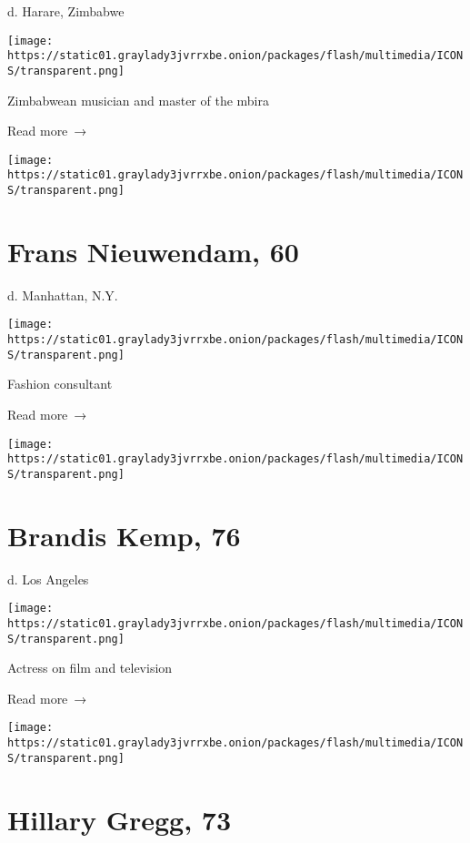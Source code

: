 d. Harare, Zimbabwe

\texttt{[image: https://static01.graylady3jvrrxbe.onion/packages/flash/multimedia/ICONS/transparent.png]}

Zimbabwean musician and master of the mbira

 Read more~→

\href{https://www.nytimes3xbfgragh.onion/2020/07/18/obituaries/frans-nieuwendam-dead-coronavirus.html}{}

\texttt{[image: https://static01.graylady3jvrrxbe.onion/packages/flash/multimedia/ICONS/transparent.png]}

\hypertarget{frans-nieuwendam-60}{%
\section{Frans Nieuwendam, 60}\label{frans-nieuwendam-60}}

d. Manhattan, N.Y.

\texttt{[image: https://static01.graylady3jvrrxbe.onion/packages/flash/multimedia/ICONS/transparent.png]}

Fashion consultant

 Read more~→

\href{https://www.nytimes3xbfgragh.onion/2020/07/17/obituaries/brandis-kemp-dead-coronavirus.html}{}

\texttt{[image: https://static01.graylady3jvrrxbe.onion/packages/flash/multimedia/ICONS/transparent.png]}

\hypertarget{brandis-kemp-76}{%
\section{Brandis Kemp, 76}\label{brandis-kemp-76}}

d. Los Angeles

\texttt{[image: https://static01.graylady3jvrrxbe.onion/packages/flash/multimedia/ICONS/transparent.png]}

Actress on film and television

 Read more~→

\href{https://www.nytimes3xbfgragh.onion/2020/07/16/obituaries/hillary-gregg-dead-coronavirus.html}{}

\texttt{[image: https://static01.graylady3jvrrxbe.onion/packages/flash/multimedia/ICONS/transparent.png]}

\hypertarget{hillary-gregg-73}{%
\section{Hillary Gregg, 73}\label{hillary-gregg-73}}

